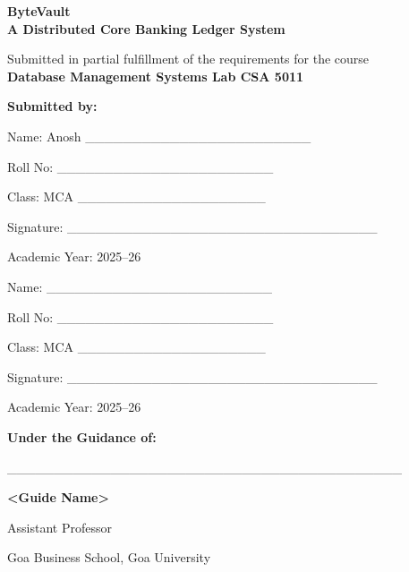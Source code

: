 \documentclass[12pt,a4paper]{report}
\begin{document}
\begin{titlepage}
    \centering
    \vspace*{1cm}
    
    {\Huge\bfseries ByteVault \\ \Large A Distributed Core Banking Ledger System\par}
    \vspace{1.5cm}
    
    {\Large Submitted in partial fulfillment of the requirements for the course \\ \textbf{Database Management Systems Lab CSA 5011}\par}
    \vspace{2cm}
    
    \textbf{Submitted by:}\par
    \vspace{0.5cm}
    \begin{flushleft}
    Name: Anosh \_\_\_\_\_\_\_\_\_\_\_\_\_\_\_\_\_\_\_\_\_\_\_\_ \par
    Roll No: \_\_\_\_\_\_\_\_\_\_\_\_\_\_\_\_\_\_\_\_\_\_\_ \par
    Class: MCA \_\_\_\_\_\_\_\_\_\_\_\_\_\_\_\_\_\_\_\_ \par
    Signature: \_\_\_\_\_\_\_\_\_\_\_\_\_\_\_\_\_\_\_\_\_\_\_\_\_\_\_\_\_\_\_\_\_ \par
    Academic Year: 2025--26 \par
    \vspace{1cm}
    Name: \_\_\_\_\_\_\_\_\_\_\_\_\_\_\_\_\_\_\_\_\_\_\_\_ \par
    Roll No: \_\_\_\_\_\_\_\_\_\_\_\_\_\_\_\_\_\_\_\_\_\_\_ \par
    Class: MCA \_\_\_\_\_\_\_\_\_\_\_\_\_\_\_\_\_\_\_\_ \par
    Signature: \_\_\_\_\_\_\_\_\_\_\_\_\_\_\_\_\_\_\_\_\_\_\_\_\_\_\_\_\_\_\_\_\_ \par
    Academic Year: 2025--26 \par
    \end{flushleft}
    
    \vfill
    
    \textbf{Under the Guidance of:}\par
    \vspace{0.5cm}
    \_\_\_\_\_\_\_\_\_\_\_\_\_\_\_\_\_\_\_\_\_\_\_\_\_\_\_\_\_\_\_\_\_\_\_\_\_\_\_\_\_\_ \par
    \textbf{<Guide Name>}\par
    Assistant Professor \par
    Goa Business School, Goa University\par
\end{titlepage}

\tableofcontents
\newpage










\end{document}
